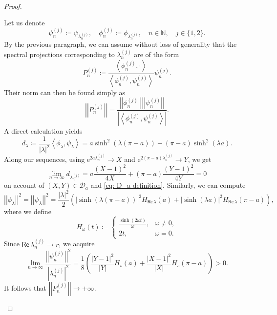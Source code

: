 \documentclass[11pt, a4paper,reqno]{amsart}
\theoremstyle{plain}
\theoremstyle{definition}
\theoremstyle{remark}
\newcommand{\inner}[2]{\left\langle{#1}, {#2}\right\rangle}
\newcommand{\norm}[1]{\left|\left|#1\right|\right|}
\newcommand{\1}{\mathds 1}
\renewcommand{\Re}{\mathsf{Re}\,}
\begin{document}
\begin{proof}
\begin{enumerate}
        Let us denote
        \[
        \psi_n^{(j)} \coloneqq \psi_{\lambda_n^{(j)}}, \quad \phi_n^{(j)} \coloneqq \phi_{\lambda_n^{(j)}}, \quad n \in \mathbb N, \quad j \in \{1, 2\}.
        \]
        By the previous paragraph, we can assume without loss of generality that the spectral projections corresponding to $\lambda_n^{(j)}$ are of the form
        \[
        P_n^{(j)} \coloneqq \frac{\inner{\phi_n^{(j)}}{\cdot}}{\inner{\phi_n^{(j)}}{\psi_n^{(j)}}}\psi_n^{(j)}.
        \]
        Their norm can then be found simply as
        \[
        \norm{P_n^{(j)}} = \frac{\norm{\phi_n^{(j)}} \norm{\psi_n^{(j)}}}{\left|\inner{\phi_n^{(j)}}{\psi_n^{(j)}}\right|}.
        \]
        A direct calculation yields
        \begin{equation}
        d_\lambda \coloneqq \frac{1}{|\lambda|^2}\inner{\phi_\lambda}{\psi_\lambda} = a\sinh^2(\lambda(\pi-a)) + (\pi-a)\sinh^2(\lambda a).
        \label{eq: d_lambda}
        \end{equation}
        Along our sequences, using $\mathrm{e}^{2a\lambda_n^{(j)}} \to X$ and $\mathrm{e}^{2(\pi-a)\lambda_n^{(j)}} \to Y$, we get
        \begin{equation}
        \lim_{n\to \infty}d_{\lambda_n^{(j)}} = a\frac{(X-1)^2}{4X} + (\pi-a)\frac{(Y-1)^2}{4Y} = 0
        \label{d_lambda_n}
        \end{equation}
        on account of $(X, Y) \in \mathcal D_a$ and \eqref{eq: D_a definition}.
        Similarly, we can compute
        \begin{equation}
        \norm{\phi_\lambda}^2 = \norm{\psi_\lambda}^2 = \frac{|\lambda|^2}{2}\left(|\sinh(\lambda(\pi-a))|^2H_{\Re\lambda}(a) + |\sinh(\lambda a)|^2H_{\Re \lambda}(\pi-a)\right),
        \label{eq: Eigenfunction norm}
        \end{equation}
        where we define
        \begin{equation}
        H_\omega(t) \coloneqq \begin{cases}
            \frac{\sinh(2\omega t)}{\omega}, & \omega \neq 0, \\
            2t, & \omega = 0.
        \end{cases}
        \label{eq: Definition of H}
        \end{equation}
        Since $\Re \lambda_n^{(j)} \to r$, we acquire
        \[
        \lim_{n\to \infty}\frac{\norm{\psi_n^{(j)}}^2}{|\lambda_n^{(j)}|^2} = \frac{1}{8}\left(\frac{|Y-1|^2}{|Y|}H_s(a) + \frac{|X-1|^2}{|X|}H_s(\pi-a)\right) > 0.
        \]
        It follows that $\norm{P_n^{(j)}} \to +\infty$.


\end{enumerate}
\end{proof}
\end{document}
